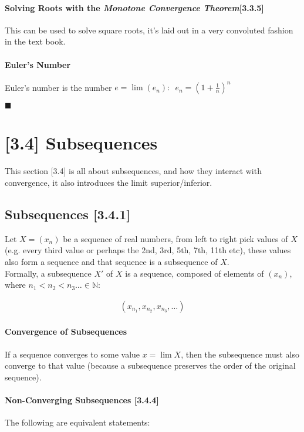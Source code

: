 \documentclass[class=article, crop=false]{standalone}
\begin{document}
\paragraph{Solving Roots with the \textit{Monotone Convergence Theorem}[3.3.5]}
This can be used to solve square roots, it's laid out in a very convoluted fashion in the text book.
\paragraph{Euler's Number}
Euler's number is the number $e = \lim(e_{n}): \enspace e_{n} = \left( 1 + \frac{1}{n} \right)^n$

\begin{flushright}
  $\blacksquare$
\end{flushright}

\section{[3.4] Subsequences}
This section [3.4] is all about subsequences, and how they interact with convergence, it also introduces the limit superior/inferior.

\subsection{Subsequences [3.4.1]}
Let $X = \left( x_n \right)$ be a sequence of real numbers, from left to right pick values of $X$ (e.g. every third value or perhaps the 2nd, 3rd, 5th, 7th, 11th etc), these values also form a sequence and that sequence is a subsequence of $X$. \\

Formally, a subsequence $X'$ of $X$ is a sequence, composed of elements of $(x_n)$, where $n_1 < n_2 < n_3 \dots \in \mathbb{N}$:

\begin{align}
  \left( x_{n_1}, x_{n_2}, x_{n_3}, \dots \right)
  \label{341} \tag{3.4.1}
\end{align}


\paragraph{Convergence of Subsequences} If a sequence converges to some value $x=\lim X$, then the subsequence must also converge to that value (because a subsequence preserves the order of the original sequence).

\paragraph{Non-Converging Subsequences [3.4.4]} The following are equivalent statements:
\end{document}
